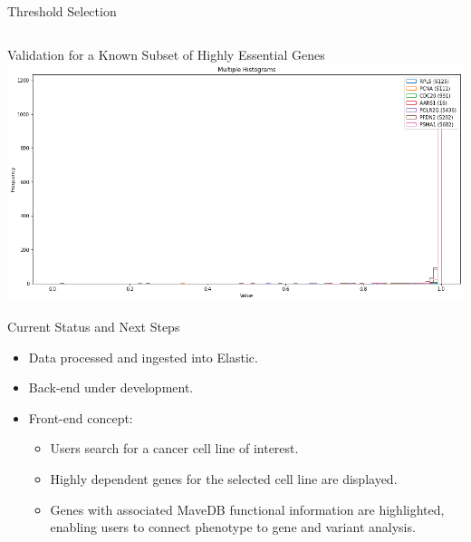 \documentclass[handout]{beamer}
\begin{document}
\begin{frame}{Threshold Selection}
\begin{columns}
    \end{columns}
\end{frame}

\begin{frame}{Validation for a Known Subset of Highly Essential Genes}
    \centering
    \includegraphics[width=0.9\linewidth]{validation_housekeeping_genes.png}
\end{frame}

\begin{frame}{Current Status and Next Steps}
    \begin{itemize}
        \item Data processed and ingested into Elastic.
        \item Back-end under development.
        \item Front-end concept:
        \begin{itemize}
            \item Users search for a cancer cell line of interest.
            \item Highly dependent genes for the selected cell line are displayed.
            \item Genes with associated MaveDB functional information are highlighted, enabling users to connect phenotype to gene and variant analysis.
        \end{itemize}
    \end{itemize}
\end{frame}
\end{document}
